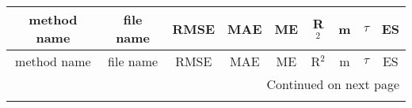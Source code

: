 \documentclass{article}
\begin{document}
\begin{center}
\scriptsize
\begin{longtable}{|ccccccccc|}
\toprule
               method name &                                  file name &              RMSE &               MAE &                   ME &             R$^2$ &                    m &               $\tau$ &                   ES \\
\midrule
\endfirsthead

\toprule
               method name &                                  file name &              RMSE &               MAE &                   ME &             R$^2$ &                    m &               $\tau$ &                   ES \\
\midrule
\endhead
\midrule
\multicolumn{9}{r}{{Continued on next page}} \\
\midrule
\endfoot


\end{longtable}
\end{center}
\end{document}
